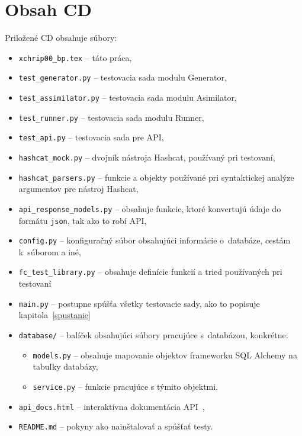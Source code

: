 \chapter{Obsah CD}
\label{cd}
Priložené CD obsahuje súbory:
\begin{itemize}
	\item \texttt{xchrip00\_bp.tex} -- táto práca,
	\item \texttt{test\_generator.py} -- testovacia sada modulu Generator,
	\item \texttt{test\_assimilator.py} -- testovacia sada modulu Asimilator,
	\item \texttt{test\_runner.py} -- testovacia sada modulu Runner,
	\item \texttt{test\_api.py} -- testovacia sada pre API,
	\item \texttt{hashcat\_mock.py} -- dvojník nástroja Hashcat, používaný pri testovaní,
	\item \texttt{hashcat\_parsers.py} -- funkcie a objekty používané pri syntaktickej analýze argumentov pre nástroj Hashcat,
	\item \texttt{api\_response\_models.py} -- obsahuje funkcie, ktoré konvertujú údaje do formátu \texttt{json}, tak ako to robí API,
	\item \texttt{config.py} -- konfiguračný súbor obsahujúci informácie o~databáze, cestám k~súborom a iné,
	\item \texttt{fc\_test\_library.py} -- obsahuje definície funkcií a tried používaných pri testovaní
	\item \texttt{main.py} -- postupne spúšťa všetky testovacie sady, ako to popisuje kapitola~\ref{spustanie}
	\item \texttt{database/} -- balíček obsahujúci súbory pracujúce s~databázou, konkrétne:
		\begin{itemize}
			\item \texttt{models.py} -- obsahuje mapovanie objektov frameworku SQL Alchemy na tabuľky databázy,
			\item \texttt{service.py} -- funkcie pracujúce s týmito objektmi.
		\end{itemize}
	\item \texttt{api\_docs.html} -- interaktívna dokumentácia API~\cite{Mucka},
	\item \texttt{README.md} -- pokyny ako nainštalovať a spúšťať testy.
\end{itemize}

